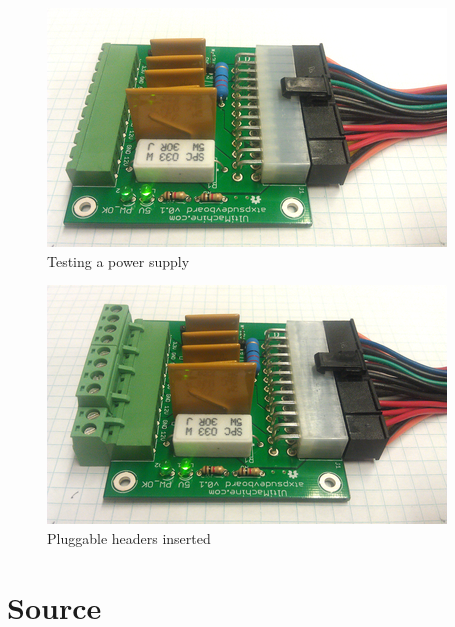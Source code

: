 \begin{figure}[htbp]
\centering
\includegraphics{./png/step-11.png}
\caption{Testing a power supply}
\end{figure}

\begin{figure}[htbp]
\centering
\includegraphics{./png/step-12.png}
\caption{Pluggable headers inserted}
\end{figure}

\section{Source}

